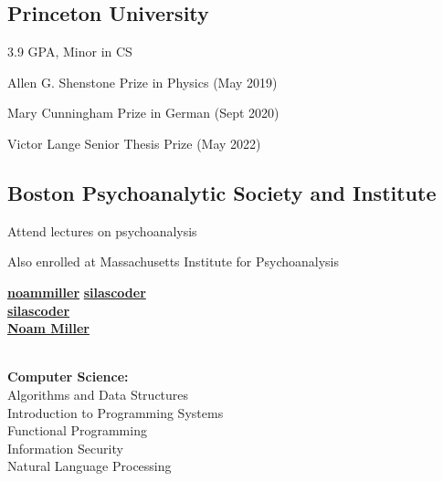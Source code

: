 \documentclass[a4paper]{MagicalCV}
\begin{document}
\lastupdated


\begin{minipage}[t]{0.33\textwidth} 


\subsection{Princeton University}
\vspace{\topsep}
\begin{tightemize}
\item 3.9 GPA, Minor in CS
\item Allen G. Shenstone Prize in Physics (May 2019)
\item Mary Cunningham Prize in German (Sept 2020)
\item Victor Lange Senior Thesis Prize (May 2022)
\end{tightemize}
\hspace{0.3cm}


\subsection{Boston Psychoanalytic Society and Institute}
\vspace{\topsep}
\begin{tightemize}
\item Attend lectures on psychoanalysis
\item Also enrolled at Massachusetts Institute for Psychoanalysis
\end{tightemize}
\sectionsep


 \href{https://github.com/noammiller}{\bf noammiller}
 \href{https://github.com/silascoder}{\bf silascoder} \\
 \href{https://salsa.debian.org/silascoder}{\bf silascoder} \\
 \href{https://www.linkedin.com/in/noam-miller-8853a4154}{\bf Noam Miller}
\sectionsep

 \\
\textbf{Computer Science:} \\
Algorithms and Data Structures \\
Introduction to Programming Systems \\
Functional Programming \\
Information Security \\
Natural Language Processing \\


\end{minipage}
\end{document}
